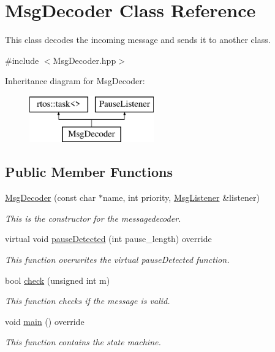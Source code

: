 \hypertarget{class_msg_decoder}{}\section{Msg\+Decoder Class Reference}
\label{class_msg_decoder}


This class decodes the incoming message and sends it to another class.  




{\ttfamily \#include $<$Msg\+Decoder.\+hpp$>$}

Inheritance diagram for Msg\+Decoder\+:\begin{figure}[H]
\begin{center}
\leavevmode
\includegraphics[height=2.000000cm]{class_msg_decoder}
\end{center}
\end{figure}
\subsection*{Public Member Functions}
\begin{DoxyCompactItemize}
\item 
\mbox{\hyperlink{class_msg_decoder_adc14f0f7ba3c05ef362502b54ffa2970}{Msg\+Decoder}} (const char $\ast$name, int priority, \mbox{\hyperlink{class_msg_listener}{Msg\+Listener}} \&listener)
\begin{DoxyCompactList}\small\item\em This is the constructor for the messagedecoder. \end{DoxyCompactList}\item 
virtual void \mbox{\hyperlink{class_msg_decoder_ac83f1179595fbd34295668baf17385fc}{pause\+Detected}} (int pause\+\_\+length) override
\begin{DoxyCompactList}\small\item\em This function overwrites the virtual pause\+Detected function. \end{DoxyCompactList}\item 
bool \mbox{\hyperlink{class_msg_decoder_a8dd1cc50baab5555661a9a9af7f3949f}{check}} (unsigned int m)
\begin{DoxyCompactList}\small\item\em This function checks if the message is valid. \end{DoxyCompactList}\item 
void \mbox{\hyperlink{class_msg_decoder_a0bf9b7579b386b8c9e18a9c606e80604}{main}} () override
\begin{DoxyCompactList}\small\item\em This function contains the state machine. \end{DoxyCompactList}\end{DoxyCompactItemize}


